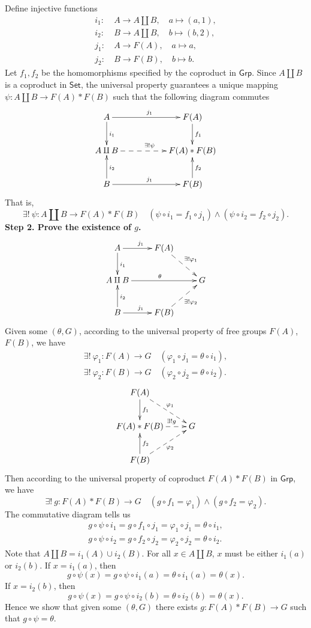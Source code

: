 \documentclass[12pt,letterpaper,boxed]{hmcpset}
\newcommand{\Grp}{\mathsf{Grp}}
\newcommand{\Set}{\mathsf{Set}}
\begin{document}
\begin{solution}
\noindent Define injective functions 
\begin{align*}
i_1:\ &A\longrightarrow A\amalg B,\quad a\longmapsto (a,1),\\ 
i_2:\ &B\longrightarrow A\amalg B,\quad b\longmapsto (b,2),\\
j_1:\ &A\longrightarrow F(A),\quad a\longmapsto a,\\ 
j_2:\ &B\longrightarrow F(B),\quad b\longmapsto b.
\end{align*}
Let $f_1,f_2$ be the homomorphisms specified by the coproduct in $\Grp$. Since $A\amalg B$ is a coproduct in $\Set$, the universal property guarantees a unique mapping $\psi:A\amalg B\rightarrow F(A)*F(B)$ such that the following diagram commutes
\[\xymatrix{
	A\ar[rr]^{j_1}\ar[d]^{i_1}&&F(A)\ar[d]^{f_1}  \\
	A\amalg B\ar@{-->}[rr]^{\exists!\psi}  &&F(A)*F(B)\\
	B\ar[rr]^{j_1}\ar[u]_{i_2}&&F(B)\ar[u]_{f_2}  \\ 
}\]
That is,
\[
\exists!\ \psi:A\amalg B\longrightarrow F(A)*F(B)\quad(\psi\circ i_1=f_1\circ j_1)\wedge (\psi\circ i_2=f_2\circ j_2).
\]
\noindent\textbf{Step 2. Prove the existence of $g$.}
\[\xymatrix{
	A\ar[r]^{j_1}\ar[d]^{i_1}&F(A)\ar@{-->}[rd]^{\exists!\varphi_1}  \\
	A\amalg B\ar[rr]^{\theta}&  &G\\
	B\ar[r]^{j_1}\ar[u]_{i_2}&F(B)\ar@{-->}[ru]_{\exists!\varphi_2}    \\ 
}\]
Given some $(\theta,G)$, according to the universal property of free groups $F(A)$, $F(B)$, we have
\begin{align*}
\exists!\ \varphi_1:F(A)\longrightarrow G\quad(\varphi_1\circ j_1=\theta\circ i_1),\\ 
\exists!\ \varphi_2:F(B)\longrightarrow G\quad(\varphi_2\circ j_2=\theta\circ i_2).
\end{align*} 
\[\xymatrix{
	F(A)\ar[d]^{f_1}\ar@{-->}[rd]^{\varphi_1}  \\
    F(A)*F(B)\ar@{-->}[r]^{\hspace{1.3em}\exists!g} &G\\
	F(B)\ar[u]_{f_2}\ar@{-->}[ru]_{\varphi_2}    \\ 
}\]
Then according to the universal property of coproduct $F(A)*F(B)$ in $\Grp$, we have
\[
\exists!\ g:F(A)*F(B)\longrightarrow G\quad(g\circ f_1= \varphi_1)\wedge (g\circ f_2= \varphi_2).
\]
The commutative diagram tells us
\begin{align*}
g\circ \psi\circ i_1=g\circ f_1\circ j_1=\varphi_1\circ j_1=\theta\circ i_1,\\
g\circ \psi\circ i_2=g\circ f_2\circ j_2=\varphi_2\circ j_2=\theta\circ i_2.
\end{align*}
Note that $A\amalg B=i_1(A)\cup i_2(B)$. For all $x\in A\amalg B$, $x$ must be either $i_1(a)$ or $i_2(b)$. If $x=i_1(a)$, then
\[
g\circ \psi(x)=g\circ \psi\circ i_1(a)=\theta\circ i_1(a)=\theta(x).
\]  
If $x=i_2(b)$, then
\[
g\circ \psi(x)=g\circ \psi\circ i_2(b)=\theta\circ i_2(b)=\theta(x).
\]  
Hence we show that given some $(\theta,G)$ there exists $g:F(A)*F(B)\longrightarrow G$ such that $g\circ \psi=\theta$.\\


\end{solution}
\end{document}
